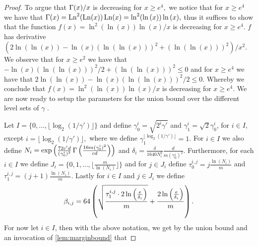 \begin{proof}
    To argue that $ \operatorname{\Gamma}(x)/x $  is decreasing  for $ x\geq e^{4},$ we notice that for $ x\geq e^{4} $ we have that $ \operatorname{\Gamma}(x)=\operatorname{\mathrm{Ln}}^{2}(\operatorname{\mathrm{Ln}}(x))\operatorname{\mathrm{Ln}}(x)=\ln^{2}(\ln{\left(x \right)})\ln{\left(x \right)},$ thus it suffices to show that the function $ f(x)=\ln^{2}(\ln{\left(x \right)})\ln{\left(x \right)}/x $ is decreasing for $ x\geq e^{4}.$  
    $ f $ has derivative $ (2\ln{\left(\ln{\left(x \right)} \right)}-\ln{\left(x \right)}(\ln{\left(\ln{\left(x \right)} \right)})^{2}+\left(\ln{\left(\ln{\left(x \right)} \right)}\right)^{2})/x^{2}.$ 
    We observe that for $ x\geq e^{2} $ we have that $  -\ln{\left(x \right)}(\ln{\left(\ln{\left(x \right)} \right)})^{2}/2+\left(\ln{\left(\ln{\left(x \right)} \right)}\right)^{2} \leq 0$ and for $ x\geq e^{4} $ we have that $ 2\ln{\left(\ln{\left(x \right)} \right)}-\ln{\left(x \right)}(\ln{\left(\ln{\left(x \right)} \right)})^{2}/2\leq 0.$ Whereby we conclude that $ f(x)=\ln^{2}(\ln{\left(x \right)})\ln{\left(x \right)}/x $ is decreasing for $ x\geq e^{4}.$ We are now ready to setup the parameters for the union bound over the different level sets of $ \gamma $ . 

    Let $I=\{   0,\ldots,\lfloor\log_{2}(  1/\gamma')\rfloor \}$
    and define $ \gamma_{0}^{i}=\sqrt{2^{i}\gamma' } $ and $ \gamma_{1}^{i}=\sqrt{2}\gamma_{0}^{i}$, for $ i\in I$, except $ i=\lfloor\log_{2}(  1/\gamma')\rfloor,$ where we define $ \gamma_{1}^{\lfloor\log_{2}(  1/\gamma')\rfloor}=1 $. For $ i\in I $ we also define $ N_{i}= \exp{\left(\frac{72 c'd}{ (\gamma_{0}^{i})^{2}} \operatorname{\Gamma}{\left(  \frac{16m(\gamma_{0}^{i})^{2}}{cd} \right)} \right)}  $ and $ \delta_{i}= \frac{\delta}{1640N_{i}^{2}} \frac{d}{m(\gamma_{0}^{i})^{2}}$. Furthermore, for each $ i\in I $ we define $ J_{i} =\{0, 1,\ldots,\big\lfloor\frac{m}{\ln{\left(N_{i} \right)}}\big\rfloor\}$ and for $ j\in J_{i} $  define  $ \tau_{0}^{i,j}=j\frac{\ln{\left(N_{i} \right)}}{m} $ and $ \tau_{1}^{i,j}=\left(j+1\right)\frac{\ln{\left(N_{i} \right)}}{m} $. Lastly for $ i\in I $ and $ j\in J_{i} $ we define
    \begin{align*}
        \beta_{i,j}= 64\left(\sqrt{\frac{\tau_{1}^{i,j}\cdot 2 \ln{\left(\frac{e}{\delta_{i}} \right)}}{m}} 
         +\frac{2\ln{\left(\frac{e}{\delta_{i}} \right)}}{m}\right).
     \end{align*} 
    For now let  $ i\in I  $, then with the above notation, we get by the union bound and an invocation of \cref{lem:marginbound} that 
    

\end{proof}
